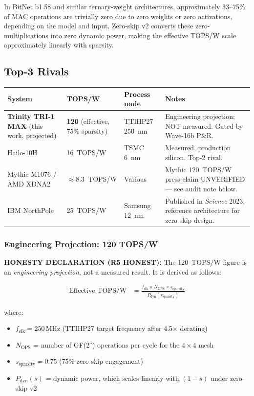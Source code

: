 In BitNet b1.58 \cite{ma_bitnet_158} and similar ternary-weight architectures,
approximately 33--75\% of MAC operations are trivially zero due to zero weights
or zero activations, depending on the model and input.
Zero-skip v2 converts these zero-multiplications into zero dynamic power,
making the effective TOPS/W scale approximately linearly with sparsity.

\subsection{Top-3 Rivals}

\begin{center}
\begin{longtable}{p{3cm}p{3cm}p{3.5cm}p{4.5cm}}
\toprule
\textbf{System} & \textbf{TOPS/W} & \textbf{Process node} & \textbf{Notes} \\
\midrule
\endhead
\textbf{Trinity TRI-1 MAX} (this work, projected) &
  \textbf{120} (effective, 75\% sparsity) &
  TTIHP27 250~nm &
  Engineering projection; NOT measured. Gated by Wave-16b P\&R. \\
Hailo-10H \cite{hailo10h_datasheet} &
  16~TOPS/W &
  TSMC 6~nm &
  Measured, production silicon. Top-2 rival. \\
Mythic M1076 / AMD XDNA2 &
  $\approx$8.3~TOPS/W &
  Various &
  Mythic 120~TOPS/W press claim UNVERIFIED --- see audit note below. \\
IBM NorthPole \cite{modha_northpole_2023} &
  25~TOPS/W &
  Samsung 12~nm &
  Published in \emph{Science} 2023; reference architecture for zero-skip design. \\
\bottomrule
\end{longtable}
\end{center}

\subsubsection{Engineering Projection: 120 TOPS/W}

\textbf{HONESTY DECLARATION (R5 HONEST):} The 120~TOPS/W figure is an
\emph{engineering projection}, not a measured result.
It is derived as follows:

\begin{align}
\text{Effective TOPS/W} &=
  \frac{f_{\mathrm{clk}} \times N_{\mathrm{OPS}} \times s_{\mathrm{sparsity}}}{P_{\mathrm{dyn}}(s_{\mathrm{sparsity}})}
\end{align}

where:
\begin{itemize}
  \item \(f_{\mathrm{clk}} = 250\,\mathrm{MHz}\) (TTIHP27 target frequency after 4.5\(\times\) derating)
  \item \(N_{\mathrm{OPS}}\) = number of GF(\(2^4\)) operations per cycle for the \(4 \times 4\) mesh
  \item \(s_{\mathrm{sparsity}} = 0.75\) (75\% zero-skip engagement)
  \item \(P_{\mathrm{dyn}}(s)\) = dynamic power, which scales linearly with \((1-s)\) under zero-skip v2
\end{itemize}

